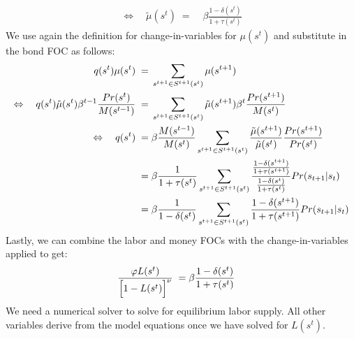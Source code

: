 \documentclass[a4paper, 12pt]{article}
\begin{document}
\begin{Answer}
\begin{align}
		\Leftrightarrow \quad \tilde{\mu}(s^t) \; = & \; \beta \frac{1-\delta(s^t)}{1+\tau(s^t)}%
	\end{align}%
	We use again the definition for change-in-variables for $\mu(s^t)$ and substitute in the bond FOC as follows:%
	\begin{align}%
		q(s^t) \mu(s^t) \; = & \; \sum_{s^{t+1} \in S^{t+1}(s^t)} \mu(s^{t+1})\notag\\%
		\Leftrightarrow \quad q(s^t) \tilde{\mu}(s^t) \beta^{t-1} \frac{Pr(s^t)}{M(s^{t-1})} \; = & \; \sum_{s^{t+1} \in S^{t+1}(s^t)} \tilde{\mu}(s^{t+1}) \beta^t \frac{Pr(s^{t+1})}{M(s^t)}\notag\\%
		\Leftrightarrow \quad q(s^t) \; = & \; \beta \frac{M(s^{t-1})}{M(s^t)} \sum_{s^{t+1} \in S^{t+1}(s^t)} \frac{\tilde{\mu}(s^{t+1})}{\tilde{\mu}(s^t)} \frac{Pr(s^{t+1})}{Pr(s^t)}\notag\\%
		= & \; \beta \frac{1}{1+\tau(s^t)} \sum_{s^{t+1} \in S^{t+1}(s^t)} \frac{\frac{1-\delta(s^{t+1})}{1+\tau(s^{t+1})}}{\frac{1-\delta(s^t)}{1+\tau(s^t)}} Pr(s_{t+1}|s_t)\notag\\%
		= & \; \beta \frac{1}{1-\delta(s^t)} \sum_{s^{t+1} \in S^{t+1}(s^t)} \frac{1-\delta(s^{t+1})}{1+\tau(s^{t+1})} Pr(s_{t+1}|s_t)%
	\end{align}%
	Lastly, we can combine the labor and money FOCs with the change-in-variables applied to get:%
	\begin{align}%
		\frac{\varphi L(s^t)}{\Bigl[1-L(s^t)\Bigr]^\nu} \; = & \; \beta \frac{1-\delta(s^t)}{1+\tau(s^t)}%
	\end{align}%
	We need a numerical solver to solve for equilibrium labor supply. All other variables derive from the model equations once we have solved for $L(s^t)$.%
\end{Answer}%
\bigskip%
\end{document}
